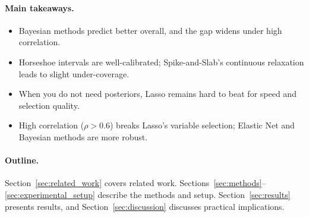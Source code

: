 \paragraph{Main takeaways.}
\begin{itemize}[nosep]
    \item Bayesian methods predict better overall, and the gap widens under high correlation.
    \item Horseshoe intervals are well-calibrated; Spike-and-Slab's continuous relaxation leads to slight under-coverage.
    \item When you do not need posteriors, Lasso remains hard to beat for speed and selection quality.
    \item High correlation ($\rho > 0.6$) breaks Lasso's variable selection; Elastic Net and Bayesian methods are more robust.
\end{itemize}

\paragraph{Outline.}
Section~\ref{sec:related_work} covers related work.
Sections~\ref{sec:methods}--\ref{sec:experimental_setup} describe the methods and setup.
Section~\ref{sec:results} presents results, and Section~\ref{sec:discussion} discusses practical implications.
